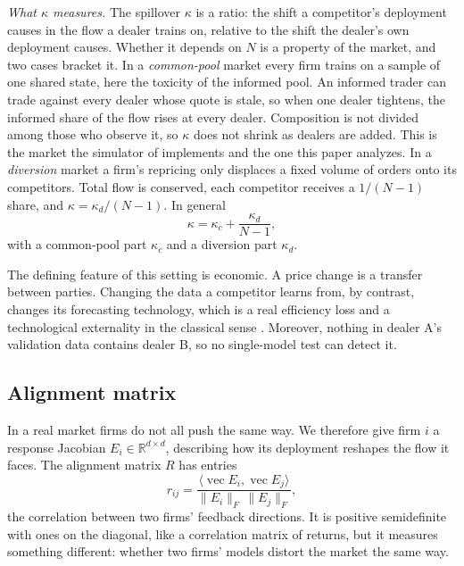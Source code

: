 \documentclass[conference]{IEEEtran}
\theoremstyle{definition}
\newcommand{\vecop}{\operatorname{vec}}
\begin{document}
\emph{What $\kappa$ measures.} The spillover $\kappa$ is a ratio: the shift a
competitor's deployment causes in the flow a dealer trains on, relative to the
shift the dealer's own deployment causes. Whether it depends on $N$ is a
property of the market, and two cases bracket it. In a \emph{common-pool}
market every firm trains on a sample of one shared state, here the toxicity of
the informed pool. An informed trader can trade against every dealer whose
quote is stale, so when one dealer tightens, the informed share of the flow
rises at every dealer. Composition is not divided among those who observe it,
so $\kappa$ does not shrink as dealers are added. This is the market the
simulator of \cite{reflex2026} implements and the one this paper analyzes. In
a \emph{diversion} market a firm's repricing only displaces a fixed volume of
orders onto its competitors. Total flow is conserved, each competitor receives
a $1/(N-1)$ share, and $\kappa = \kappa_d/(N-1)$. In general
\begin{equation}
  \kappa = \kappa_c + \frac{\kappa_d}{N-1},
  \label{eq:kappa}
\end{equation}
with a common-pool part $\kappa_c$ and a diversion part $\kappa_d$.

The defining feature of this setting is economic. A price change is a transfer
between parties. Changing the data a competitor learns from, by contrast,
changes its forecasting technology, which is a real efficiency loss and a
technological externality in the classical sense \cite{buchanan1962}.
Moreover, nothing in dealer A's validation data contains dealer B, so no
single-model test can detect it.

\subsection{Alignment matrix}
In a real market firms do not all push the same way. We therefore give firm
$i$ a response Jacobian $E_i \in \mathbb{R}^{d\times d}$, describing how its
deployment reshapes the flow it faces. The alignment matrix $R$ has entries
\begin{equation}
  r_{ij} = \frac{\langle \vecop E_i, \vecop E_j \rangle}
                {\|E_i\|_F\,\|E_j\|_F},
  \label{eq:align}
\end{equation}
the correlation between two firms' feedback directions. It is positive
semidefinite with ones on the diagonal, like a correlation matrix of returns,
but it measures something different: whether two firms' models distort the
market the same way.
\end{document}
